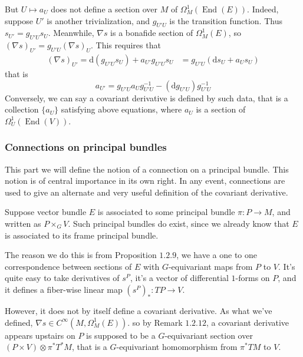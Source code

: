 \documentclass[11pt]{amsart}
\numberwithin{equation}{section}
\theoremstyle{plain}
\theoremstyle{plain}
\numberwithin{equation}{section}
\begin{document}
But $U\mapsto a_U$ does not define a section over $M$ of $\Omega_M^1(\operatorname{End}(E))$. Indeed, suppose $U'$ is another trivialization, and $g_{U'U}$ is the transition function. Thus $s_{U'}=g_{U'U}s_U$. Meanwhile, $\nabla s$ is a bonafide section of $\Omega_M^1(E)$, so $(\nabla s)_{U'}=g_{U'U}(\nabla s)_U$. This requires that 
$$
\begin{aligned}
(\nabla s)_{U'}=\mathrm{d}(g_{U'U}s_U)+a_{U'}g_{U'U}s_U&=g_{U'U}(\mathrm{d}s_U+a_Us_U)
\end{aligned}
$$
that is 
$$
a_{U'}=g_{U'U}a_Ug_{U'U}^{-1}-(\mathrm{d}g_{U'U})g_{U'U}^{-1}
$$
Conversely, we can say a covariant derivative is defined by such data, that is a collection $\{a_U\}$ satisfying above equations, where $a_U$ is a section of $\Omega_U^1(\operatorname{End}(V))$.
\subsubsection{Connections on principal bundles}
This part we will define the notion of a connection on a principal bundle. This notion is of central importance in its own right. In any event, connections are used to give an alternate and very useful definition of the covariant derivative.

Suppose vector bundle $E$ is associated to some principal bundle $\pi:P\to M$, and written as $P\times_{G}V$. Such principal bundles do exist, since we already know that $E$ is associated to its frame principal bundle.

The reason we do this is from Proposition $1.2.9$, we have a one to one correspondence between sections of $E$ with $G$-equivariant maps from $P$ to $V$. It's quite easy to take derivatives of $s^P$, it's a vector of differential $1$-forms on $P$, and it defines a fiber-wise linear map $(s^P)_*:TP\to V$. 

However, it does not by itself define a covariant derivative. As what we've defined, $\nabla s\in C^{\infty}(M,\Omega_M^1(E))$. so by Remark $1.2.12$, a covariant derivative appears upstairs on $P$ is supposed to be a $G$-equivariant section over $(P\times V)\otimes\pi^*T^*M$, that is a $G$-equivariant homomorphism from $\pi^*TM$ to $V$.
\end{document}
